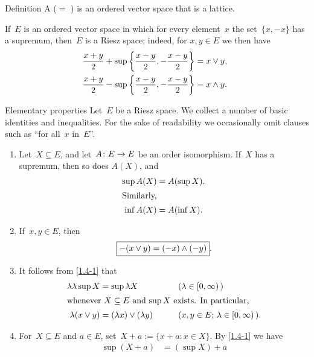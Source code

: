 \documentclass[main.tex]{subfiles}
\begin{document}
%
%
\begin{psec}{Definition}
\label{1.3}
A  ($=$ )
is an ordered vector space that is a lattice.

If~$E$ is an ordered vector space 
in which for every element~$x$
the set~$\{x,-x\}$ has a supremum,
then~$E$ is a Riesz space;
indeed,
for $x,y\in E$
we then have
\begin{align*}
\frac{x+y}{2} + \sup\left\{ \frac{x-y}{2}, -\frac{x-y}{2} \right\} 
  & = x\vee y\textnormal{,} \\ 
\frac{x+y}{2} - \sup\left\{ \frac{x-y}{2}, -\frac{x-y}{2} \right\}
  & = x\wedge y\textnormal{. }
\end{align*}
\end{psec}
%
%
\begin{psec}{Elementary properties}
\label{1.4}
Let~$E$ be a Riesz space. 
We collect a number of basic identities and inequalities.
For the sake of readability
we occasionally omit clauses such as ``for all~$x$ in~$E$''.
\begin{enumerate}
\item %
\label{1.4-1}
Let~$X\subseteq E$, and let~$A\colon E\rightarrow E$ 
be an order isomorphism.
If~$X$ has a supremum,
then so does $A(X)$,
and
\begin{align*}
\sup A(X) &= A(\sup X)
\htam{.} \\
\intertext{%
Similarly, %
}
\inf A(X) &= A(\inf X)
\htam{.}
\end{align*}
\item %
\label{1.4-2}
If~$x,y\in E$, then
\begin{equation*}
\fbox{$  -(x\vee y) = (-x)\wedge(-y)  $}
\textnormal{.}
\end{equation*}
\item %
\label{1.4-3}
It follows from \ref{1.4-1} that
\begin{alignat*}
\lambda \lambda \sup X &= \sup \lambda X \qquad &&(\lambda \in [0,\infty)\,) \\
\intertext{%
whenever~$X\subseteq E$ and~$\sup X$ exists.
In particular, }
\lambda (x \vee y) &=  (\lambda x) \vee (\lambda y) 
  \qquad &&(x,y\in E\htam{; }\lambda\in[0,\infty)\,)\htam{.}
\end{alignat*}
\item %
\label{1.4-4}
For~$X\subseteq E$ and $a\in E$,
set~$X+a:=\{x+a\colon x\in X\}$.
By \ref{1.4-1} we have
\begin{align*}
\sup(X+a) &= (\sup X) + a \\

\end{align*}
\end{enumerate}
\end{psec}
\end{document}
